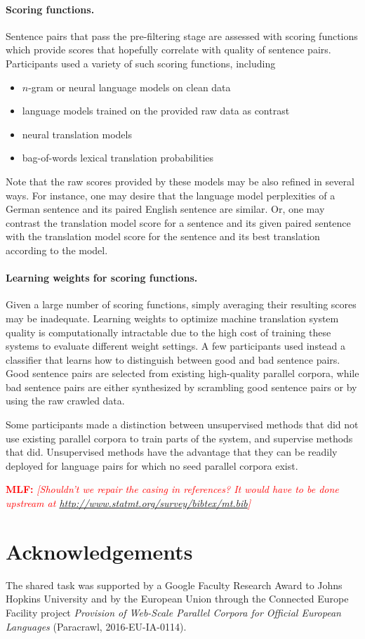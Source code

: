 \documentclass[11pt,a4paper]{article}
\newcommand{\todomlf}[1] {\textcolor{red}{\textbf{MLF:} \em [#1]}\marginpar{\textcolor{red}{\Large \textbf{!!!}}}}
\begin{document}
\paragraph{Scoring functions.} Sentence pairs that pass the pre-filtering stage are assessed with scoring functions which provide scores that hopefully correlate with quality of sentence pairs. Participants used a variety of such scoring functions, including
\begin{itemize}\vspace{-2pt}\itemsep 1pt
\item $n$-gram or neural language models on clean data
\item language models trained on the provided raw data as contrast
\item neural translation models
\item bag-of-words lexical translation probabilities
\end{itemize}
Note that the raw scores provided by these models may be also refined in several ways. For instance, one may desire that the language model perplexities of a German sentence and its paired English sentence are similar. Or, one may contrast the translation model score for a sentence and its given paired sentence with the translation model score for the sentence and its best translation according to the model.

\paragraph{Learning weights for scoring functions.} Given a large number of scoring functions, simply averaging their resulting scores may be inadequate. Learning weights to optimize machine translation system quality is computationally intractable due to the high cost of training these systems to evaluate different weight settings. A few participants used instead a classifier that learns how to distinguish between good and bad sentence pairs. Good sentence pairs are selected from existing high-quality parallel corpora, while bad sentence pairs are either synthesized by scrambling good sentence pairs or by using the raw crawled data.

Some participants made a distinction between unsupervised methods that did not use existing parallel corpora to train parts of the system, and supervise methods that did. Unsupervised methods have the advantage that they can be readily deployed for language pairs for which no seed parallel corpora exist.

\todomlf{Shouldn't we repair the casing in references? It would have to be done upstream at \url{http://www.statmt.org/survey/bibtex/mt.bib}}

\section*{Acknowledgements}
The shared task was supported by a Google Faculty Research Award to Johns Hopkins University and by the European Union through the Connected Europe Facility project {\em Provision of Web-Scale Parallel Corpora for Official European Languages} (Paracrawl, 2016-EU-IA-0114).

 

\end{document}
